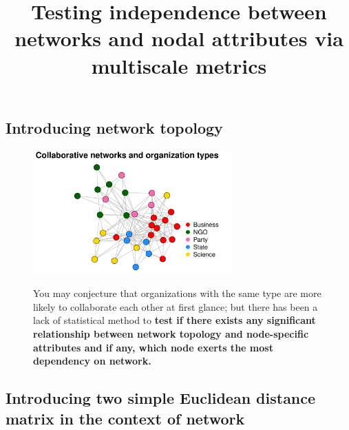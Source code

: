 \documentclass[12pt]{article}
\begin{document}
	
	\title{Testing independence between networks and nodal attributes via multiscale metrics}	
		
\subsection*{Introducing network topology}

\begin{figure}[H]
	\centering
	\includegraphics[width=3in]{../Figure/introplot.pdf}	
	\label{fig:intro}
	\caption{You may conjecture that organizations with the same type are more likely to collaborate each other at first glance; but there has been a lack of statistical method to \textbf{test if there exists any significant relationship between network topology and node-specific attributes and if any, which node exerts the most dependency on network.}}
\end{figure}



\subsection*{Introducing two simple Euclidean distance matrix in the context of network}
\end{document}
